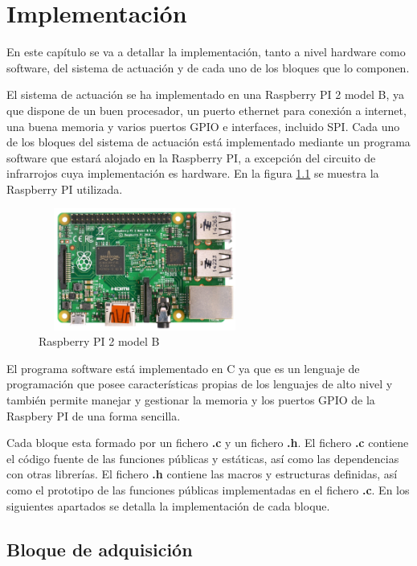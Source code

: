 \chapter{Implementación}\label{cap:implementacion}

	En este capítulo se va a detallar la implementación, tanto a nivel hardware como software, del sistema de actuación y de cada uno de los bloques que lo componen.

	 El sistema de actuación se ha implementado en una Raspberry PI 2 model B, ya que dispone de un buen procesador, un puerto ethernet para conexión a internet, una buena memoria y varios puertos GPIO e interfaces, incluido SPI. Cada uno de los bloques del sistema de actuación está implementado mediante un programa software que estará alojado en la Raspberry PI, a excepción del circuito de infrarrojos cuya implementación es hardware. En la figura \ref{5_1:Hardware} se muestra la Raspberry PI utilizada.

\begin{figure}[htbp]
  \centering
  \includegraphics[width=70mm, height=40mm]{imagenes/capitulo5/5_1_RaspberryPI}
   \caption{Raspberry PI 2 model B}
   \label{5_1:Hardware}
\end{figure}

	El programa software está implementado en C ya que es un lenguaje de programación que posee características propias de los lenguajes de alto nivel y también permite manejar y gestionar la memoria y los puertos GPIO de la Raspbery PI de una forma sencilla.

	Cada bloque esta formado por un fichero \textbf{.c} y un fichero \textbf{.h}. El fichero \textbf{.c} contiene el código fuente de las funciones públicas y estáticas, así como las dependencias con otras librerías. El fichero \textbf{.h} contiene las macros y estructuras definidas, así como el prototipo de las funciones públicas implementadas en el fichero \textbf{.c}. En los siguientes apartados se detalla la implementación de cada bloque.

\section{Bloque de adquisición}\label{implementacion:adquisicion}

